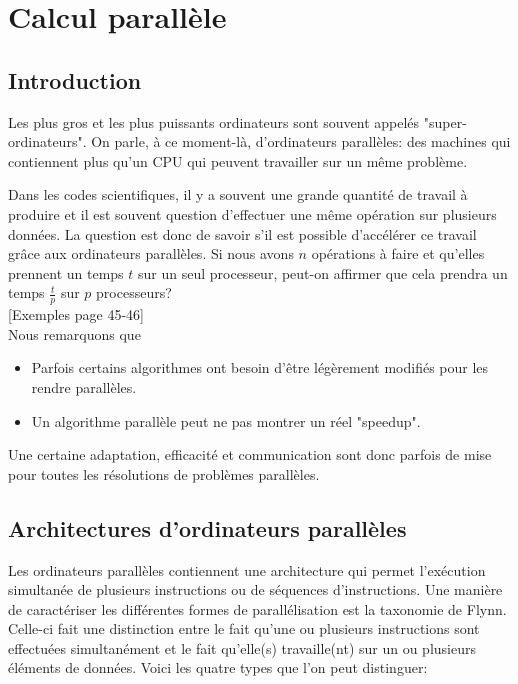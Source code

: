 \chapter{Calcul parallèle}

\section{Introduction}
Les plus gros et les plus puissants ordinateurs sont souvent appelés "super-ordinateurs". On parle, à ce moment-là, d'ordinateurs parallèles: des machines qui contiennent plus qu'un CPU qui peuvent travailler sur un même problème.

Dans les codes scientifiques, il y a souvent une grande quantité de travail à produire et il est souvent question d'effectuer une même opération sur plusieurs données. La question est donc de savoir s'il est possible d'accélérer ce travail grâce aux ordinateurs parallèles. Si nous avons $n$ opérations à faire et qu'elles prennent un temps $t$ sur un seul processeur, peut-on affirmer que cela prendra un temps $\frac{t}{p}$ sur $p$ processeurs?\\

[Exemples page 45-46]\\


Nous remarquons que 
\begin{itemize}
\item Parfois certains algorithmes ont besoin d'être légèrement modifiés pour les rendre parallèles.
\item Un algorithme parallèle peut ne pas montrer un réel "speedup".
\end{itemize}
Une certaine adaptation, efficacité et communication sont donc parfois de mise pour toutes les résolutions de problèmes parallèles.

 
\section{Architectures d'ordinateurs parallèles}
	Les ordinateurs parallèles contiennent une architecture qui permet l'exécution simultanée de plusieurs instructions ou de séquences d'instructions. Une manière de caractériser les différentes formes de parallélisation est la taxonomie de Flynn. Celle-ci fait une distinction entre le fait qu'une ou plusieurs instructions sont effectuées simultanément et le fait qu'elle(s) travaille(nt) sur un ou plusieurs éléments de données. Voici les quatre types que l'on peut distinguer:
	
